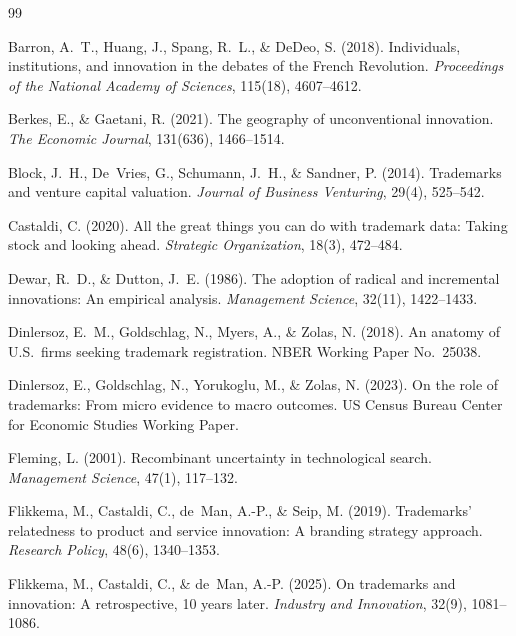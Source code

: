 \begin{thebibliography}{99}

Barron, A.~T., Huang, J., Spang, R.~L., \& DeDeo, S. (2018). Individuals,
institutions, and innovation in the debates of the French Revolution.
\emph{Proceedings of the National Academy of Sciences}, 115(18),
4607--4612.

Berkes, E., \& Gaetani, R. (2021). The geography of unconventional
innovation. \emph{The Economic Journal}, 131(636), 1466--1514.

Block, J.~H., De~Vries, G., Schumann, J.~H., \& Sandner, P. (2014).
Trademarks and venture capital valuation. \emph{Journal of Business
Venturing}, 29(4), 525--542.

Castaldi, C. (2020). All the great things you can do with trademark data:
Taking stock and looking ahead. \emph{Strategic Organization}, 18(3),
472--484.

Dewar, R.~D., \& Dutton, J.~E. (1986). The adoption of radical and
incremental innovations: An empirical analysis. \emph{Management Science},
32(11), 1422--1433.

Dinlersoz, E.~M., Goldschlag, N., Myers, A., \& Zolas, N. (2018). An
anatomy of U.S.\ firms seeking trademark registration. NBER Working Paper
No.\ 25038.

Dinlersoz, E., Goldschlag, N., Yorukoglu, M., \& Zolas, N. (2023). On the
role of trademarks: From micro evidence to macro outcomes. US Census
Bureau Center for Economic Studies Working Paper.

Fleming, L. (2001). Recombinant uncertainty in technological search.
\emph{Management Science}, 47(1), 117--132.

Flikkema, M., Castaldi, C., de~Man, A.-P., \& Seip, M. (2019). Trademarks'
relatedness to product and service innovation: A branding strategy
approach. \emph{Research Policy}, 48(6), 1340--1353.

Flikkema, M., Castaldi, C., \& de~Man, A.-P. (2025). On trademarks and
innovation: A retrospective, 10 years later. \emph{Industry and
Innovation}, 32(9), 1081--1086.


\end{thebibliography}
